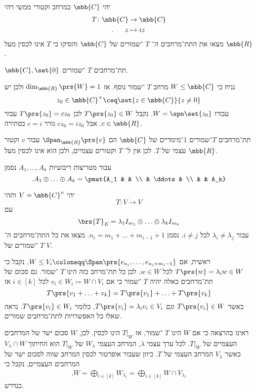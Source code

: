 \documentclass[a4paper,10pt,twoside,openany]{book}
\begin{document}
\begin{exercisechap}
יהי
$\mbb{C}$
כמרחב וקטורי ממשי ויהי
\begin{align*}
T \colon \mbb{C} &\to \mbb{C} \\
\text{.} \hphantom{lala} z &\mapsto iz
\end{align*}
מצאו את התת־מרחבים ה־%
$T$%
־שמורים של
$\mbb{C}$
והסיקו כי
$T$
אינו לכסין מעל
$\mbb{R}$.
\end{exercisechap}

\begin{solution}
$\mbb{C}, \set{0}$
תת־מרחבים
$T$%
־שמורים.

נניח כי
$W \leq \mbb{C}$
מרחב
$T$%
־שמור נוסף. אז
$\dim_{\mbb{R}}\prs{W} = 1$
ולכן יש
\[z_0 \in \mbb{C}^\times \ceq \set{z \in \mbb{C}}{z \neq 0}\]
עבורו
$W = \spn\set{z_0}$.
נקבל
$T\prs{z_0} \in W$
לכן
$T\prs{z_0} = c z_0$
עבור
$c \in \mbb{R}$.
אבל
$c z_0 = i z_0$
גורר
$c = i$
בסתירה.

תת־מרחבים $T$־שמורים $1$־מימדיים של
$\mbb{C}$
הם
$\Span_{\mbb{R}}\prs{v}$
עבור
$v$
וקטור עצמי של
$T$.
 לכן אין ל־%
$T$
וקטורים עצמיים, ולכן הוא אינו לכסין מעל
$\mbb{R}$.
\end{solution}

\begin{notation}
עבור מטריצות ריבועיות
$A_1, \ldots, A_k$
נסמן
\[\text{.} A_1 \oplus \ldots \oplus A_k = \pmat{A_1 & & \\ & \ddots & \\ & & A_k}\]
\end{notation}

\begin{exercisechap}
יהי
$V = \mbb{C}^n$
ותהי
\[T \colon V \to V\]
עם
\[\brs{T}_E = \lambda_1 I_{m_1} \oplus \ldots \oplus \lambda_k I_{m_k}\]
עבור
$\lambda_i \neq \lambda_j$
לכל
$i \neq j$.
נסמן
$n_i = m_1 + \ldots + m_{i-1} + 1$.
מצאו את כל התת־מרחבים ה־%
$T$%
־שמורים של
$V$.
\end{exercisechap}

\begin{solution}
ראשית, אם
$W \leq V_i \coloneqq \Span\prs{e_{n_i}, \ldots, e_{n_i + m_i - 1}}$,
נקבל כי
$T\prs{w} = \lambda_i w \in W$
לכל
$w \in W$.
לכן כל תת־מרחב כזה הינו
$T$%
־שמור.
גם סכום של תת־מרחבים כאלה יהיה
$T$%
־שמור כי אם
$v_i \in W_i \coloneqq W \cap V_i$
לכל
$i \in [k]$
אז
\[T\prs{v_1 + \ldots + v_k} = T\prs{v_1} + \ldots + T\prs{v_k}\]
כאשר
$T\prs{v_i} \in W$
וגם
$T\prs{v_i} = \lambda_i v_i \in V_i$,
כלומר
$T\prs{v_i} \in W_i$.
נראה שאלו כל האפשרויות לתת־מרחבים שמורים.

ראינו בהרצאה כי אם
$W$
הינו
$T$%
־שמור, אז
$\left. T \right|_W$
הינו לכסין.
לכן,
$W$
סכום ישר של המרחבים העצמיים של
$\left. T \right|_W$.
לכל ערך עצמי
$\lambda$,
המרחב העצמי
$W_{\lambda}$
של
$\left. T \right|_W$
הוא החיתוך
$V_\lambda \cap W$
כאשר
$V_\lambda$
המרחב העצמי של
$T$.
כיוון שעבור אופרטור לכסין המרחב שווה לסכום ישר של המרחבים העצמיים, נקבל כי
\begin{align*}
\text{,} W = \bigoplus_{i \in [k]} W_{\lambda_i} = \bigoplus_{i \in [k]} W \cap V_{\lambda_i}
\end{align*}
כנדרש.
\end{solution}
\end{document}
